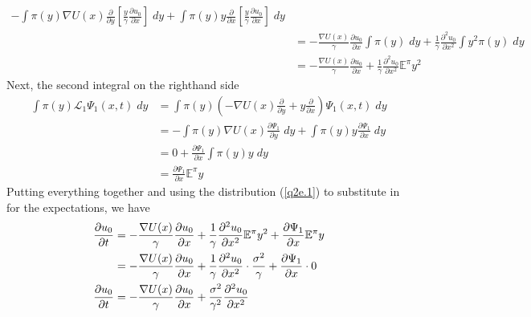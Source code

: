 \documentclass[12pt]{article}
\theoremstyle{plain}
\theoremstyle{definition}
\theoremstyle{remark}
\begin{document}
\begin{enumerate}
\begin{enumerate}
\begin{align*}
              -\int \pi(y)
                \nabla U(x) \frac{\partial }{\partial y}
                \left[\frac{y}{\gamma} \frac{\partial u_0}{\partial x}\right] \; dy
              +
              \int \pi(y)
              y \frac{\partial }{\partial x}
              \left[\frac{y}{\gamma} \frac{\partial u_0}{\partial x}\right] \; dy\\
            &=
              - \frac{\nabla U(x)}{\gamma} \frac{\partial u_0}{\partial x}
              \int \pi(y) \; dy
              +
              \frac{1}{\gamma} \frac{\partial^2 u_0}{\partial x^2}
              \int y^2 \pi(y) \; dy\\
            &=
              - \frac{\nabla U(x)}{\gamma} \frac{\partial u_0}{\partial x}
              +
              \frac{1}{\gamma} \frac{\partial^2 u_0}{\partial x^2}
              \mathbb{E}^\pi y^2
        \end{align*}
        Next, the second integral on the righthand side
        \begin{align*}
          \int \pi(y) \mathscr{L}_1\Psi_1(x,t) \; dy
          &=
          \int \pi(y)
            \left(
            -\nabla U(x) \frac{\partial }{\partial y}
            + y \frac{\partial }{\partial x}
            \right) \Psi_1(x,t)
            \; dy \\
          &=
          -\int \pi(y)
            \nabla U(x) \frac{\partial \Psi_1}{\partial y}
            \; dy
          +\int \pi(y)
            y \frac{\partial \Psi_1}{\partial x}
            \; dy \\
          &=
          0 +\frac{\partial \Psi_1}{\partial x}\int \pi(y) y \; dy \\
          &=
          \frac{\partial \Psi_1}{\partial x}\mathbb{E}^\pi y
        \end{align*}
        Putting everything together and using the distribution
        (\ref{q2e.1}) to substitute in for the expectations, we have
        \begin{align}
          \frac{\partial u_0}{\partial t}
          &=
          - \frac{\nabla U(x)}{\gamma} \frac{\partial u_0}{\partial x}
          + \frac{1}{\gamma} \frac{\partial^2 u_0}{\partial x^2}
          \mathbb{E}^\pi y^2
          +
          \frac{\partial \Psi_1}{\partial x}\mathbb{E}^\pi y \notag\\
          &=
          - \frac{\nabla U(x)}{\gamma} \frac{\partial u_0}{\partial x}
          + \frac{1}{\gamma} \frac{\partial^2 u_0}{\partial x^2}
          \cdot \frac{\sigma^2}{\gamma}
          + \frac{\partial \Psi_1}{\partial x} \cdot 0 \notag\\
          \frac{\partial u_0}{\partial t}
          &=
          - \frac{\nabla U(x)}{\gamma} \frac{\partial u_0}{\partial x}
          + \frac{\sigma^2}{\gamma^2} \frac{\partial^2 u_0}{\partial x^2}
          \label{q2e.2}
        \end{align}


\end{enumerate}
\end{enumerate}
\end{document}
